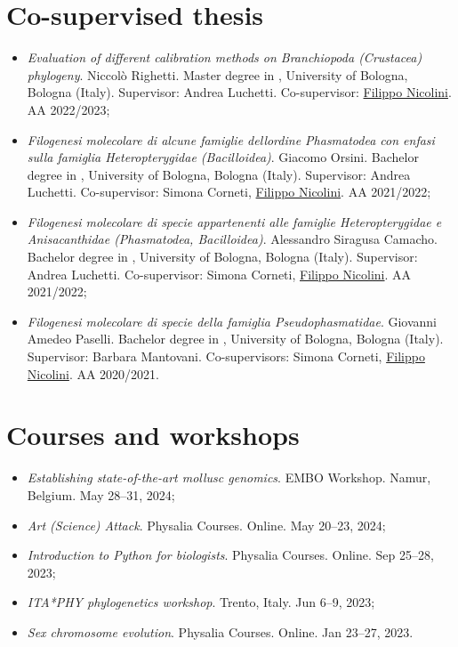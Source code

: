 \section*{Co-supervised thesis}
\begin{itemize}
    \item \textit{Evaluation of different calibration methods on Branchiopoda (Crustacea) phylogeny}. Niccolò Righetti. Master degree in , University of Bologna, Bologna (Italy). Supervisor: Andrea Luchetti. Co-supervisor: \underline{Filippo Nicolini}. AA 2022/2023;
    \item \textit{Filogenesi molecolare di alcune famiglie dell\curlyapostrophe ordine Phasmatodea con enfasi sulla famiglia Heteropterygidae (Bacilloidea)}. Giacomo Orsini. Bachelor degree in , University of Bologna, Bologna (Italy). Supervisor: Andrea Luchetti. Co-supervisor: Simona Corneti, \underline{Filippo Nicolini}. AA 2021/2022;
    \item \textit{Filogenesi molecolare di specie appartenenti alle famiglie Heteropterygidae e Anisacanthidae (Phasmatodea, Bacilloidea)}. Alessandro Siragusa Camacho. Bachelor degree in , University of Bologna, Bologna (Italy). Supervisor: Andrea Luchetti. Co-supervisor: Simona Corneti, \underline{Filippo Nicolini}. AA 2021/2022;
    \item \textit{Filogenesi molecolare di specie della famiglia Pseudophasmatidae}. Giovanni Amedeo Paselli. Bachelor degree in , University of Bologna, Bologna (Italy). Supervisor: Barbara Mantovani. Co-supervisors: Simona Corneti, \underline{Filippo Nicolini}. AA 2020/2021.
\end{itemize}

\section*{Courses and workshops}
\begin{itemize}
    \item \textit{Establishing state-of-the-art mollusc genomics}. EMBO Workshop. Namur, Belgium. May 28--31, 2024;
    \item \textit{Art (Science) Attack}. Physalia Courses. Online. May 20--23, 2024;
    \item \textit{Introduction to Python for biologists}. Physalia Courses. Online. Sep 25--28, 2023;
    \item \textit{ITA*PHY phylogenetics workshop}. Trento, Italy. Jun 6--9, 2023;
    \item \textit{Sex chromosome evolution}. Physalia Courses. Online. Jan 23--27, 2023.
\end{itemize}

